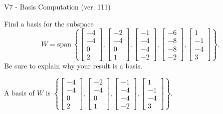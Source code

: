 \begin{exercise}
  \begin{exerciseTitle}V7 - Basis Computation (ver. 111)\end{exerciseTitle}
  \begin{exerciseStatement}
    Find a basis for the subspace 
\[W=\mathrm{span}\ \left\{\left[\begin{array}{r}
-4 \\
-4 \\
0 \\
2
\end{array}\right] , \left[\begin{array}{r}
-2 \\
-4 \\
0 \\
1
\end{array}\right] , \left[\begin{array}{r}
-1 \\
-4 \\
-4 \\
-2
\end{array}\right] , \left[\begin{array}{r}
-6 \\
-8 \\
-8 \\
-2
\end{array}\right] , \left[\begin{array}{r}
1 \\
-1 \\
-4 \\
3
\end{array}\right]\right\}.\]
 Be sure to explain why your result is a basis.


  \end{exerciseStatement}
  \begin{exerciseAnswer}
   A basis of \(W\) is  \(\left\{\left[\begin{array}{r}
-4 \\
-4 \\
0 \\
2
\end{array}\right] , \left[\begin{array}{r}
-2 \\
-4 \\
0 \\
1
\end{array}\right] , \left[\begin{array}{r}
-1 \\
-4 \\
-4 \\
-2
\end{array}\right] , \left[\begin{array}{r}
1 \\
-1 \\
-4 \\
3
\end{array}\right]\right\}\).
  


  \end{exerciseAnswer}
\end{exercise}